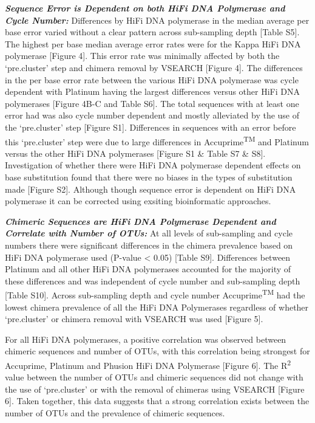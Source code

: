\documentclass[12pt,]{article}
\begin{document}
\textbf{\emph{Sequence Error is Dependent on both HiFi DNA Polymerase
and Cycle Number:}} Differences by HiFi DNA polymerase in the median
average per base error varied without a clear pattern across
sub-sampling depth {[}Table S5{]}. The highest per base median average
error rates were for the Kappa HiFi DNA polymerase {[}Figure 4{]}. This
error rate was minimally affected by both the `pre.cluster' step and
chimera removal by VSEARCH {[}Figure 4{]}. The differences in the per
base error rate between the various HiFi DNA polymerase was cycle
dependent with Platinum having the largest differences versus other HiFi
DNA polymerases {[}Figure 4B-C and Table S6{]}. The total sequences with
at least one error had was also cycle number dependent and mostly
alleviated by the use of the `pre.cluster' step {[}Figure S1{]}.
Differences in sequences with an error before this `pre.cluster' step
were due to large differences in Accuprime\textsuperscript{TM} and
Platinum versus the other HiFi DNA polymerases {[}Figure S1 \& Table S7
\& S8{]}. Investigation of whether there were HiFi DNA polymerase
dependent effects on base substitution found that there were no biases
in the types of substitution made {[}Figure S2{]}. Although though
sequence error is dependent on HiFi DNA polymerase it can be corrected
using exsiting bioinformatic approaches.

\textbf{\emph{Chimeric Sequences are HiFi DNA Polymerase Dependent and
Correlate with Number of OTUs:}} At all levels of sub-sampling and cycle
numbers there were significant differences in the chimera prevalence
based on HiFi DNA polymerase used (P-value \textless{} 0.05) {[}Table
S9{]}. Differences between Platinum and all other HiFi DNA polymerases
accounted for the majority of these differences and was independent of
cycle number and sub-sampling depth {[}Table S10{]}. Across sub-sampling
depth and cycle number Accuprime\textsuperscript{TM} had the lowest
chimera prevalence of all the HiFi DNA Polymerases regardless of whether
`pre.cluster' or chimera removal with VSEARCH was used {[}Figure 5{]}.

For all HiFi DNA polymerases, a positive correlation was observed
between chimeric sequences and number of OTUs, with this correlation
being strongest for Accuprime, Platinum and Phusion HiFi DNA Polymerase
{[}Figure 6{]}. The R\textsuperscript{2} value between the number of
OTUs and chimeric sequences did not change with the use of `pre.cluster'
or with the removal of chimeras using VSEARCH {[}Figure 6{]}. Taken
together, this data suggests that a strong correlation exists between
the number of OTUs and the prevalence of chimeric sequences.
\end{document}

